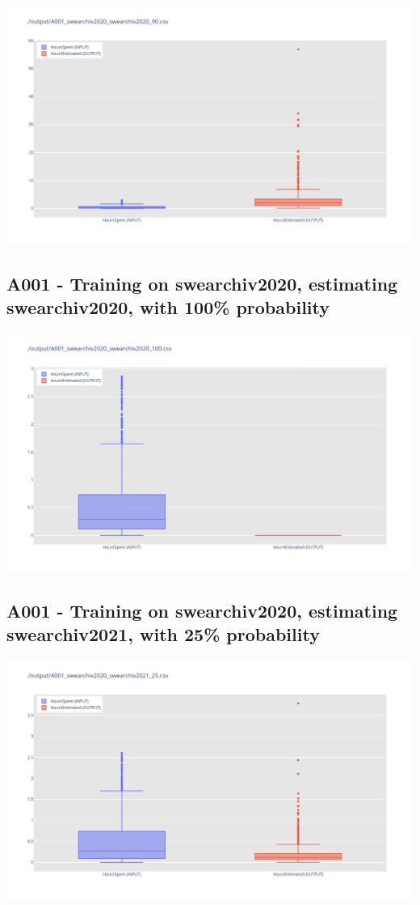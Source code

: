 \includegraphics[width=\textwidth]{Scripts/output/A001_swearchiv2020_swearchiv2020_90.csv.png}

\newpage

\subsection{A001 - Training on swearchiv2020, estimating swearchiv2020, with 100\% probability}

\includegraphics[width=\textwidth]{Scripts/output/A001_swearchiv2020_swearchiv2020_100.csv.png}


\newpage

\subsection{A001 - Training on swearchiv2020, estimating swearchiv2021, with 25\% probability}

\includegraphics[width=\textwidth]{Scripts/output/A001_swearchiv2020_swearchiv2021_25.csv.png}

